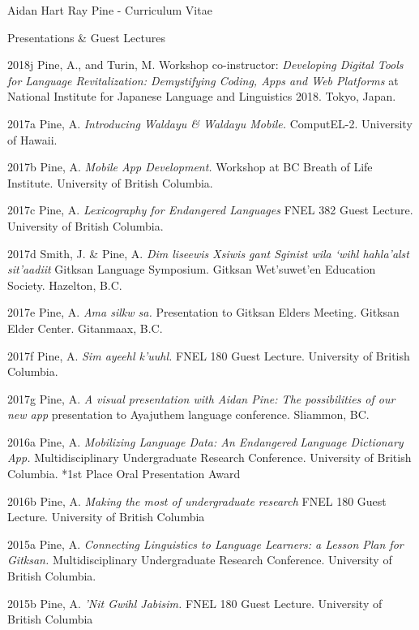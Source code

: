 \documentclass[12pt]{letter}
\begin{document}
\begin{cv}{ Aidan Hart Ray Pine  \space - \space   Curriculum Vitae}
\begin{cvlist}{Presentations \& Guest Lectures}
            \item[2018j] Pine, A., and Turin, M. Workshop co-instructor: \textit{Developing Digital Tools for Language Revitalization: Demystifying Coding, Apps and Web Platforms} at National Institute for Japanese Language and Linguistics 2018. Tokyo, Japan.
            \item[2017a] Pine, A. \textit{Introducing Waldayu \& Waldayu Mobile.} ComputEL-2. University of Hawaii.
            \item[2017b] Pine, A. \textit{Mobile App Development.} Workshop at BC Breath of Life Institute. University of British Columbia.
            \item[2017c] Pine, A. \textit{Lexicography for Endangered Languages}  FNEL 382 Guest Lecture. University of British Columbia.
            \item[2017d] Smith, J. \& Pine, A. \textit{Dim liseewis Xsiwis g̲ant Sginist wila ‘wihl hahla’alst sit’aadiit}  Gitksan Language Symposium. Gitksan Wet'suwet'en Education Society. Hazelton, B.C.
            \item[2017e] Pine, A. \textit{Ama silkw sa.} Presentation to Gitksan Elders Meeting. Gitksan Elder Center. Gitanmaax, B.C.
            \item[2017f] Pine, A. \textit{Sim ayeehl k'uuhl.} FNEL 180 Guest Lecture. University of British Columbia.
            \item[2017g] Pine, A. \textit{A visual presentation with Aidan Pine: The possibilities of our new app} presentation to Ayajuthem language conference. Sliammon, BC.
            \item[2016a] Pine, A. \textit{Mobilizing Language Data: An Endangered Language Dictionary App.} Multidisciplinary Undergraduate Research Conference. University of British Columbia. *1st Place Oral Presentation Award
            \item[2016b] Pine, A. \textit{Making the most of undergraduate research}  FNEL 180 Guest Lecture. University of British Columbia
            
            \item[2015a] Pine, A. \textit{Connecting Linguistics to Language Learners: a Lesson Plan for Gitksan.} Multidisciplinary Undergraduate Research Conference. University of British Columbia.
            
            \item[2015b] Pine, A. \textit{'Nit Gwihl Jabisim.}  FNEL 180 Guest Lecture. University of British Columbia
            

\end{cvlist}
\end{cv}
\end{document}
